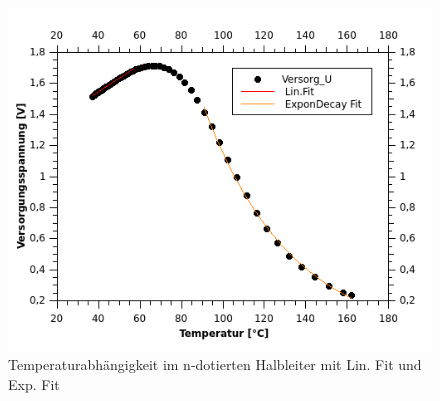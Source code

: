 \documentclass[12pt,a4paper]{article}
\begin{document}
\begin{figure}[H]
	\centering
	\includegraphics[scale=1.8]{./figures/Halbleiter_Dotierung_Verhalten.png}
	\caption{Temperaturabhängigkeit im n-dotierten Halbleiter mit Lin. Fit und Exp. Fit}
	\label{fig:halbleiter_fits}
\end{figure}
\end{document}
